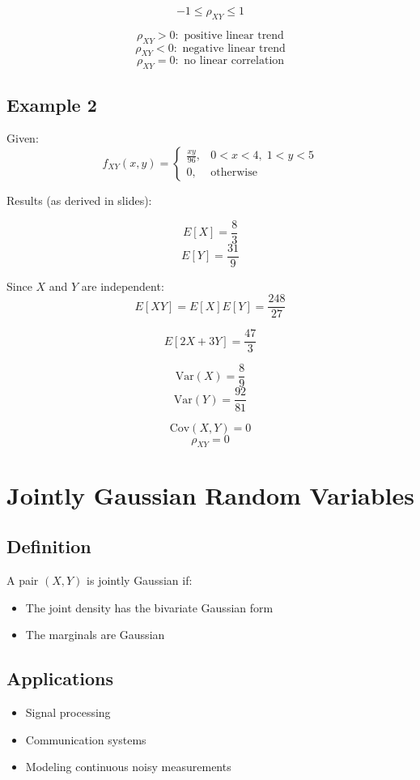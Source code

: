 \documentclass[12pt]{article}
\begin{document}
\[
-1 \le \rho_{XY} \le 1
\]

\[
\rho_{XY} > 0: \text{ positive linear trend}
\]
\[
\rho_{XY} < 0: \text{ negative linear trend}
\]
\[
\rho_{XY} = 0: \text{ no linear correlation}
\]

\subsection{Example 2}

Given:
\[
f_{XY}(x,y) =
\begin{cases}
\frac{xy}{96}, & 0 < x < 4, \; 1 < y < 5 \\
0, & \text{otherwise}
\end{cases}
\]

Results (as derived in slides):

\[
E[X] = \frac{8}{3}
\]
\[
E[Y] = \frac{31}{9}
\]

Since $X$ and $Y$ are independent:
\[
E[XY] = E[X]E[Y] = \frac{248}{27}
\]

\[
E[2X + 3Y] = \frac{47}{3}
\]

\[
\text{Var}(X) = \frac{8}{9}
\]
\[
\text{Var}(Y) = \frac{92}{81}
\]

\[
\text{Cov}(X,Y) = 0
\]
\[
\rho_{XY} = 0
\]

\section{Jointly Gaussian Random Variables}

\subsection{Definition}

A pair $(X,Y)$ is jointly Gaussian if:
\begin{itemize}
\item The joint density has the bivariate Gaussian form
\item The marginals are Gaussian
\end{itemize}

\subsection{Applications}

\begin{itemize}
\item Signal processing
\item Communication systems
\item Modeling continuous noisy measurements
\end{itemize}
\end{document}
